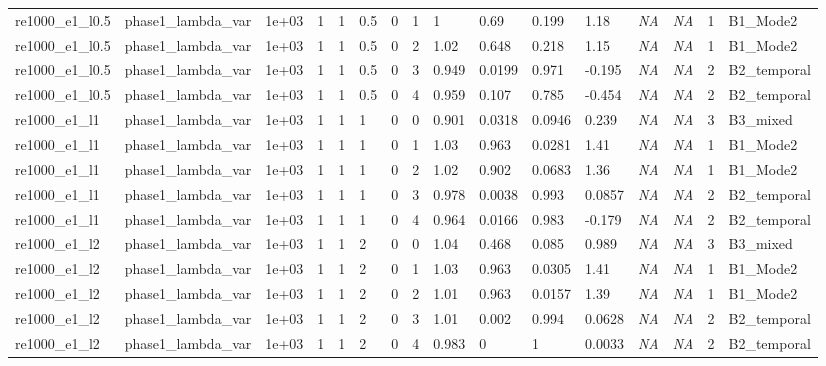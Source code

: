 \documentclass[11pt,a4paper]{article}
\begin{document}
\begin{landscape}
\begin{longtable}{*{16}{l}}
    re1000\_e1\_l0.5 & phase1\_lambda\_var & 1e+03 & 1 & 1 & 0.5 & 0 & 1 & 1 & 0.69 & 0.199 & 1.18 & \textit{NA} & \textit{NA} & 1 & B1\_Mode2 \\
    re1000\_e1\_l0.5 & phase1\_lambda\_var & 1e+03 & 1 & 1 & 0.5 & 0 & 2 & 1.02 & 0.648 & 0.218 & 1.15 & \textit{NA} & \textit{NA} & 1 & B1\_Mode2 \\
    re1000\_e1\_l0.5 & phase1\_lambda\_var & 1e+03 & 1 & 1 & 0.5 & 0 & 3 & 0.949 & 0.0199 & 0.971 & -0.195 & \textit{NA} & \textit{NA} & 2 & B2\_temporal \\
    re1000\_e1\_l0.5 & phase1\_lambda\_var & 1e+03 & 1 & 1 & 0.5 & 0 & 4 & 0.959 & 0.107 & 0.785 & -0.454 & \textit{NA} & \textit{NA} & 2 & B2\_temporal \\
    re1000\_e1\_l1 & phase1\_lambda\_var & 1e+03 & 1 & 1 & 1 & 0 & 0 & 0.901 & 0.0318 & 0.0946 & 0.239 & \textit{NA} & \textit{NA} & 3 & B3\_mixed \\
    re1000\_e1\_l1 & phase1\_lambda\_var & 1e+03 & 1 & 1 & 1 & 0 & 1 & 1.03 & 0.963 & 0.0281 & 1.41 & \textit{NA} & \textit{NA} & 1 & B1\_Mode2 \\
    re1000\_e1\_l1 & phase1\_lambda\_var & 1e+03 & 1 & 1 & 1 & 0 & 2 & 1.02 & 0.902 & 0.0683 & 1.36 & \textit{NA} & \textit{NA} & 1 & B1\_Mode2 \\
    re1000\_e1\_l1 & phase1\_lambda\_var & 1e+03 & 1 & 1 & 1 & 0 & 3 & 0.978 & 0.0038 & 0.993 & 0.0857 & \textit{NA} & \textit{NA} & 2 & B2\_temporal \\
    re1000\_e1\_l1 & phase1\_lambda\_var & 1e+03 & 1 & 1 & 1 & 0 & 4 & 0.964 & 0.0166 & 0.983 & -0.179 & \textit{NA} & \textit{NA} & 2 & B2\_temporal \\
    re1000\_e1\_l2 & phase1\_lambda\_var & 1e+03 & 1 & 1 & 2 & 0 & 0 & 1.04 & 0.468 & 0.085 & 0.989 & \textit{NA} & \textit{NA} & 3 & B3\_mixed \\
    re1000\_e1\_l2 & phase1\_lambda\_var & 1e+03 & 1 & 1 & 2 & 0 & 1 & 1.03 & 0.963 & 0.0305 & 1.41 & \textit{NA} & \textit{NA} & 1 & B1\_Mode2 \\
    re1000\_e1\_l2 & phase1\_lambda\_var & 1e+03 & 1 & 1 & 2 & 0 & 2 & 1.01 & 0.963 & 0.0157 & 1.39 & \textit{NA} & \textit{NA} & 1 & B1\_Mode2 \\
    re1000\_e1\_l2 & phase1\_lambda\_var & 1e+03 & 1 & 1 & 2 & 0 & 3 & 1.01 & 0.002 & 0.994 & 0.0628 & \textit{NA} & \textit{NA} & 2 & B2\_temporal \\
    re1000\_e1\_l2 & phase1\_lambda\_var & 1e+03 & 1 & 1 & 2 & 0 & 4 & 0.983 & 0 & 1 & 0.0033 & \textit{NA} & \textit{NA} & 2 & B2\_temporal \\

\end{longtable}
\end{landscape}
\end{document}
